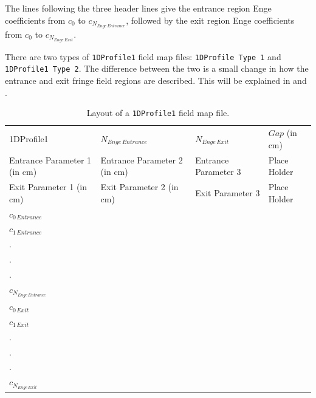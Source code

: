 The lines following the three header lines give the entrance region Enge coefficients from $c_0$ to $c_{N_{Enge\,Entrance}}$, followed
by the exit region Enge coefficients from $c_0$ to $c_{N_{Enge\,Exit}}$.

There are two types of \texttt{1DProfile1} field map files: \texttt{1DProfile Type 1} and \texttt{1DProfile1 Type 2}. The difference
between the two is a small change in how the entrance and exit fringe field regions are described. This will be explained in
 and .

\begin{table}[h!]
    \caption{Layout of a \texttt{1DProfile1} field map file.}
    \label{tab:1DProfile1}
    \begin{center}
    \begin{tabular}{llll}
      \hline
      1DProfile1 & $N_{Enge\,Entrance}$ & $N_{Enge\,Exit}$ & $Gap$ (in cm)\\
      Entrance Parameter 1 (in cm) & Entrance Parameter 2 (in cm) & Entrance Parameter 3 & Place Holder\\
      Exit Parameter 1 (in cm) & Exit Parameter 2 (in cm) & Exit Parameter 3 & Place Holder\\
      $c_{0\, Entrance}$ & & & \\
      $c_{1\, Entrance}$ & & & \\
      . & & & \\
      . & & & \\
      . & & & \\
      $c_{N_{Enge\,Entrance}}$ & & & \\
      $c_{0\,Exit}$ & & & \\
      $c_{1\,Exit}$ & & & \\
      . & & & \\
      . & & & \\
      . & & & \\
      $c_{N_{Enge\,Exit}}$ & & & \\
      \hline
    \end{tabular}
    \end{center}
\end{table}

\clearpage

